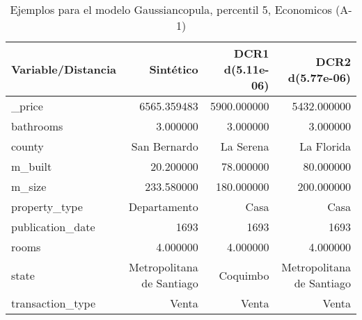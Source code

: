 \begin{table}[H]
\centering
\fontsize{10}{14}\selectfont
\caption{Ejemplos para el modelo Gaussiancopula, percentil 5, Economicos (A-1)}
\label{table-example-economicos-a-1-gaussiancopula-5p}
\begin{tabular}{|l|r|r|r|}
\hline
\rowcolor[gray]{0.8}
Variable/Distancia & Sintético & DCR1 d(5.11e-06) & DCR2 d(5.77e-06) \\
\hline \_price & \cellcolor[rgb]{0.9, 0.54, 0.52} 6565.359483 & 5900.000000 & 5432.000000 \\
\hline bathrooms & \cellcolor[rgb]{0.9, 0.54, 0.52} 3.000000 & \cellcolor[rgb]{0.9, 0.54, 0.52} 3.000000 & \cellcolor[rgb]{0.9, 0.54, 0.52} 3.000000 \\
\hline county & \cellcolor[rgb]{0.9, 0.54, 0.52} San Bernardo & La Serena & La Florida \\
\hline m\_built & \cellcolor[rgb]{0.9, 0.54, 0.52} 20.200000 & 78.000000 & 80.000000 \\
\hline m\_size & \cellcolor[rgb]{0.9, 0.54, 0.52} 233.580000 & 180.000000 & 200.000000 \\
\hline property\_type & \cellcolor[rgb]{0.9, 0.54, 0.52} Departamento & Casa & Casa \\
\hline publication\_date & \cellcolor[rgb]{0.9, 0.54, 0.52} 1693 & \cellcolor[rgb]{0.9, 0.54, 0.52} 1693 & \cellcolor[rgb]{0.9, 0.54, 0.52} 1693 \\
\hline rooms & \cellcolor[rgb]{0.9, 0.54, 0.52} 4.000000 & \cellcolor[rgb]{0.9, 0.54, 0.52} 4.000000 & \cellcolor[rgb]{0.9, 0.54, 0.52} 4.000000 \\
\hline state & \cellcolor[rgb]{0.9, 0.54, 0.52} Metropolitana de Santiago & Coquimbo & \cellcolor[rgb]{0.9, 0.54, 0.52} Metropolitana de Santiago \\
\hline transaction\_type & \cellcolor[rgb]{0.9, 0.54, 0.52} Venta & \cellcolor[rgb]{0.9, 0.54, 0.52} Venta & \cellcolor[rgb]{0.9, 0.54, 0.52} Venta \\
\hline
\end{tabular}
\end{table}
